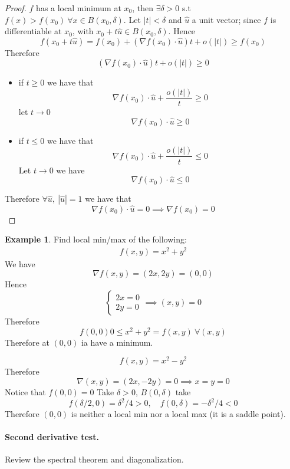 \documentclass[11pt,a4paper]{article}
\theoremstyle{definition}
\newtheorem{example}[definition]{Example}
\theoremstyle{plain}
\theoremstyle{remark}
\begin{document}
\begin{proof}
    $f$ has a local minimum at $x_0$, then $\exists \delta > 0$ s.t $f(x) > f(x_0) \ \forall x \in B(x_0, \delta)$. Let $|t| < \delta$ and 
    $\hat{u}$ a unit vector; since $f$ is differentiable at $x_0$, with $x_0 + t \hat{u} \in B(x_0, \delta)$. Hence
    $$f(x_0 + t \hat{u}) = f(x_0) + (\nabla f(x_0) \cdot \hat{u})t + o(|t|) \ge f(x_0)$$
    Therefore 
    $$(\nabla f(x_0) \cdot \hat{u}) t + o(|t|) \ge 0$$
    \begin{itemize}
        \item if $t \ge 0$ we have that 
        $$\nabla f(x_0) \cdot \hat{u} + \frac{o(|t|)}{t} \ge 0$$
        let $t \to 0$ 
        $$\nabla f(x_0) \cdot \hat{u} \ge 0$$
        \item if $t \le 0$ we have that 
        $$\nabla f(x_0) \cdot \hat{u} + \frac{o(|t|)}{t} \le 0$$
        Let $t \to 0$ we have 
        $$\nabla f(x_0) \cdot \hat{u} \le 0$$
    \end{itemize} 
    Therefore $\forall \hat{u}, \ |\hat{u}| = 1$ we have that 
    $$\nabla f(x_0) \cdot \hat{u} = 0 \implies \nabla f(x_0) = 0$$
\end{proof}

\begin{example}
    Find local min/max of the following: 
    \begin{align*}
        f(x,y) = x^2 + y^2
    \end{align*}
    We have 
    $$\nabla f(x,y) = (2x,2y) = (0,0)$$
    Hence 
    $$\begin{cases}
        2x = 0 \\
        2y = 0
    \end{cases} \implies (x,y) = 0$$
    Therefore 
    $$f(0,0) 0 \le x^2 + y^2 = f(x,y) \ \forall (x,y)$$
    Therefore at $(0,0)$ ia have a minimum.

    $$f(x,y) = x^2 - y^2$$
    Therefore 
    $$\nabla (x,y) = (2x,-2y) = 0 \implies x=y=0$$
    Notice that $f(0,0) = 0$
    Take $\delta > 0$, $B(0, \delta)$ take 
    $$f(\delta/2, 0) = \delta^2/4 > 0, \quad f(0,\delta) = -\delta^2 /4 < 0$$
    Therefore $(0,0)$ is neither a local min nor a local max (it is a saddle point). 
\end{example}

\paragraph*{Second derivative test.} 
Review the spectral theorem and diagonalization. 
\end{document}
